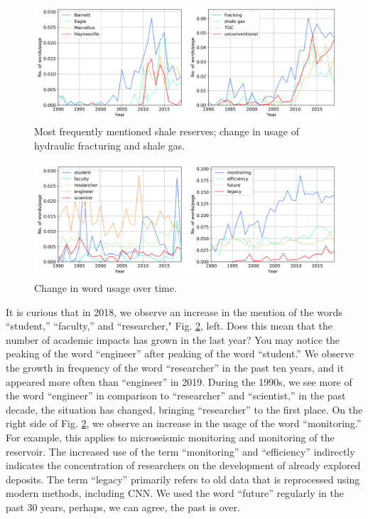 \documentclass[geosciences,article,submit,moreauthors,pdftex]{Definitions/mdpi}
\begin{document}
\begin{figure}[ht!]

\includegraphics[width=\textwidth]{shale_frac.png}

\caption{Most frequently mentioned shale reserves; change in usage of hydraulic fracturing and shale gas.}
\label{shales_frac}
\end{figure}

\begin{figure}[ht!]
\includegraphics[width=\textwidth]{sigrams_int.png}
\caption{Change in word usage over time.}
\label{stu_faculty_mon}
\end{figure}


It is curious that in 2018, we observe an increase in the mention of the words ``student,'' ``faculty,'' and ``researcher," Fig. \ref{stu_faculty_mon}, left. Does this mean that the number of academic impacts has grown in the last year? You may notice the peaking of the word ``engineer'' after peaking of the word ``student.'' We observe the growth in frequency of the word ``researcher'' in the past ten years, and it appeared more often than ``engineer'' in 2019. During the 1990s, we see more of the word ``engineer'' in comparison to ``researcher'' and ``scientist,'' in the past decade, the situation has changed, bringing ``researcher'' to the first place. On the right side of Fig. \ref{stu_faculty_mon}, we observe an increase in the usage of the word ``monitoring.'' For example, this applies to microseismic monitoring and monitoring of the reservoir. The increased use of the term ``monitoring'' and ``efficiency'' indirectly indicates the concentration of researchers on the development of already explored deposits. The term ``legacy'' primarily refers to old data that is reprocessed using modern methods, including CNN. We used the word ``future'' regularly in the past 30 years, perhaps, we can agree, the past is over.
\end{document}
